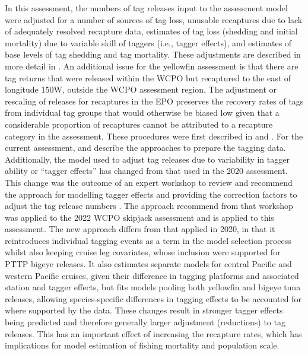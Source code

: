In this assessment, the numbers of tag releases input to the assessment model were adjusted for a number of sources of tag loss, unusable recaptures due to lack of adequately resolved recapture data, estimates of tag loss (shedding and initial mortality) due to variable skill of taggers (i.e., tagger effects), and estimates of base levels of tag shedding and tag mortality. These adjustments are described in more detail in \citet{peatman_analysis_2023-1}. An additional issue for the yellowfin assessment is that there are tag returns that were released within the WCPO but recaptured to the east of longitude 150\degree{}W, outside the WCPO assessment region. The adjustment or rescaling of releases for recaptures in the EPO preserves the recovery rates of tags from individual tag groups that would otherwise be biased low given that a considerable proportion of recaptures cannot be attributed to a recapture category in the assessment. These procedures were first described in \citet{berger_analysis_2014} and \citet{mckechnie_construction_2016}. For the current assessment, \citet{peatman_analysis_2023-1} and \citet{teears_cpue_2023} describe the approaches to prepare the tagging data. Additionally, the model used to adjust tag releases due to variability in tagger ability or \enquote{tagger effects} has changed from that used in the 2020 assessment. This change was the outcome of an expert workshop to review and recommend the approach for modelling tagger effects and providing the correction factors to adjust the tag release numbers \citep{peatman_analysis_2022-1}. The approach recommend from that workshop was applied to the 2022 WCPO skipjack assessment \citep{castillo_jordan_stock_2022} and is applied to this assessment. The new approach differs from that applied in 2020, in that it reintroduces individual tagging events as a term in the model selection process whilst also keeping cruise leg covariates, whose inclusion were supported for PTTP bigeye releases. It also estimates separate models for central Pacific and western Pacific cruises, given their difference in tagging platforms and associated station and tagger effects, but fits models pooling both yellowfin and bigeye tuna releases, allowing species-specific differences in tagging effects to be accounted for where supported by the data. These changes result in stronger tagger effects being predicted and therefore generally larger adjustment (reductions) to tag releases. This has an important effect of increasing the recapture rates, which has implications for model estimation of fishing mortality and population scale.

